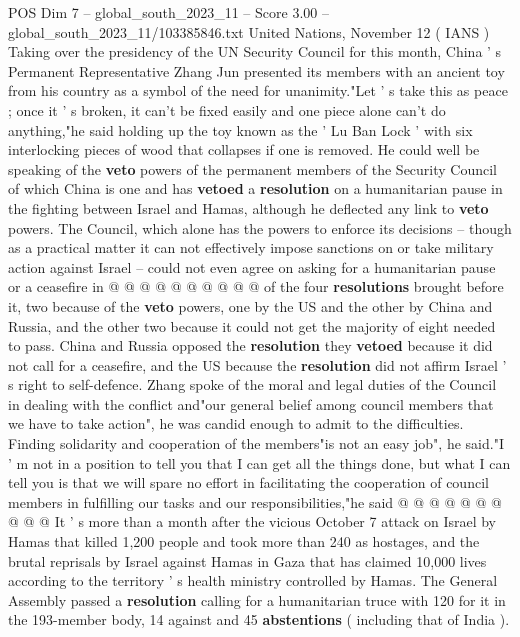 \begin{textsample}{POS Dim 7 – global\_south\_2023\_11 – Score 3.00 – global\_south\_2023\_11/103385846.txt}  \label{ex:f7_pos_125}
United Nations, November 12 ( IANS ) Taking over the presidency of the UN Security Council for this month, China ' s Permanent Representative Zhang Jun presented its members with an ancient toy from his country as a symbol of the need for unanimity."Let ' s take this as peace ; once it ' s broken, it can't be fixed easily and one piece alone can't do anything,"he said holding up the toy known as the ' Lu Ban Lock ' with six interlocking pieces of wood that collapses if one is removed.
He could well be speaking of the \textbf{veto} powers of the permanent members of the Security Council of which China is one and has \textbf{vetoed} a \textbf{resolution} on a humanitarian pause in the fighting between Israel and Hamas, although he deflected any link to \textbf{veto} powers.
The Council, which alone has the powers to enforce its decisions -- though as a practical matter it can not effectively impose sanctions on or take military action against Israel -- could not even agree on asking for a humanitarian pause or a ceasefire in @ @ @ @ @ @ @ @ @ @ of the four \textbf{resolutions} brought before it, two because of the \textbf{veto} powers, one by the US and the other by China and Russia, and the other two because it could not get the majority of eight needed to pass.
China and Russia opposed the \textbf{resolution} they \textbf{vetoed} because it did not call for a ceasefire, and the US because the \textbf{resolution} did not affirm Israel ' s right to self-defence.
Zhang spoke of the moral and legal duties of the Council in dealing with the conflict and"our general belief among council members that we have to take action", he was candid enough to admit to the difficulties.
Finding solidarity and cooperation of the members"is not an easy job", he said."I ' m not in a position to tell you that I can get all the things done, but what I can tell you is that we will spare no effort in facilitating the cooperation of council members in fulfilling our tasks and our responsibilities,"he said @ @ @ @ @ @ @ @ @ @ It ' s more than a month after the vicious October 7 attack on Israel by Hamas that killed 1,200 people and took more than 240 as hostages, and the brutal reprisals by Israel against Hamas in Gaza that has claimed 10,000 lives according to the territory ' s health ministry controlled by Hamas.
The General Assembly passed a \textbf{resolution} calling for a humanitarian truce with 120 for it in the 193-member body, 14 against and 45 \textbf{abstentions} ( including that of India ).

\end{textsample}
